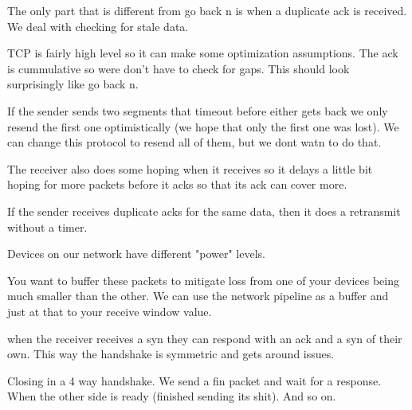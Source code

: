 \documentclass{article}
\begin{document}

The only part that is different from go back n is when a duplicate ack is received. We deal with checking for stale data.


TCP is fairly high level so it can make some optimization assumptions. The ack is cummulative so were don't have to check for gaps. This should look surprisingly like go back n.


If the sender sends two segments that timeout before either gets back we only resend the first one optimistically (we hope that only the first one was lost). We can change this protocol to resend all of them, but we dont watn to do that.


The receiver also does some hoping when it receives so it delays a little bit hoping for more packets before it acks so that its ack can cover more.



If the sender receives duplicate acks for the same data, then it does a retransmit without a timer.




Devices on our network have different "power" levels.


You want to buffer these packets to mitigate loss from one of your devices being much smaller than the other. We can use the network pipeline as a buffer and just at that to your receive window value. 


when the receiver receives a syn they can respond with an ack and a syn of their own. This way the handshake is symmetric and gets around issues. 





Closing in a 4 way handshake. We send a fin packet and wait for a response. When the other side is ready (finished sending its shit). And so on.


\end{document}
